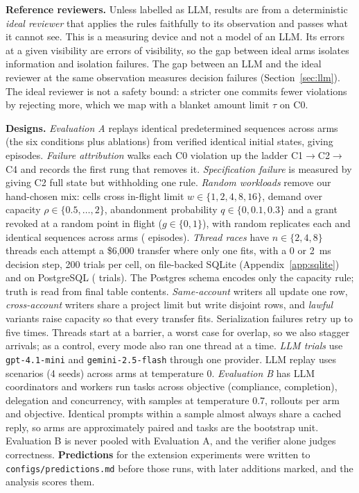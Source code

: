 \documentclass[10pt]{article}
\begin{document}
\textbf{Reference reviewers.} Unless labelled as LLM, results are from a deterministic \emph{ideal reviewer} that applies the rules faithfully to its observation and passes what it cannot see. This is a measuring device and not a model of an LLM. Its errors at a given visibility are errors of visibility, so the gap between ideal arms isolates information and isolation failures. The gap between an LLM and the ideal reviewer at the same observation measures decision failures (Section~\ref{sec:llm}). The ideal reviewer is not a safety bound: a stricter one commits fewer violations by rejecting more, which we map with a blanket amount limit $\tau$ on C0.

\textbf{Designs.} \emph{Evaluation A} replays identical predetermined sequences across \nArms{} arms (the six conditions plus ablations) from verified identical initial states, giving \nEpisodes{} episodes. \emph{Failure attribution} walks each C0 violation up the ladder C1$\to$C2$\to$C4 and records the first rung that removes it. \emph{Specification failure} is measured by giving C2 full state but withholding one rule. \emph{Random workloads} remove our hand-chosen mix: \wlCells{} cells cross in-flight limit $w\in\{1,2,4,8,16\}$, demand over capacity $\rho\in\{0.5,\dots,2\}$, abandonment probability $q\in\{0,0.1,0.3\}$ and a grant revoked at a random point in flight ($g\in\{0,1\}$), with \wlReps{} random replicates each and identical sequences across arms (\wlEpisodes{} episodes). \emph{Thread races} have $n\in\{2,4,8\}$ threads each attempt a \$6,000 transfer where only one fits, with a 0 or 2~ms decision step, 200 trials per cell, on file-backed SQLite (Appendix~\ref{app:sqlite}) and on PostgreSQL \pgVersion{} (\pgTrials{} trials). The Postgres schema encodes only the capacity rule; truth is read from final table contents. \emph{Same-account} writers all update one row, \emph{cross-account} writers share a project limit but write disjoint rows, and \emph{lawful} variants raise capacity so that every transfer fits. Serialization failures retry up to five times. Threads start at a barrier, a worst case for overlap, so we also stagger arrivals; as a control, every mode also ran one thread at a time. \emph{LLM trials} use \texttt{gpt-4.1-mini} and \texttt{gemini-2.5-flash} through one provider. LLM replay uses \nLlmFixedScenarios{} scenarios (4 seeds) across \nLlmFixedArms{} arms at temperature 0. \emph{Evaluation B} has LLM coordinators and workers run \nLlmRollTasks{} tasks across objective (compliance, completion), delegation and concurrency, with \nLlmRollSamples{} samples at temperature 0.7, \rlPerCell{} rollouts per arm and objective. Identical prompts within a sample almost always share a cached reply, so arms are approximately paired and tasks are the bootstrap unit. Evaluation B is never pooled with Evaluation A, and the verifier alone judges correctness. \textbf{Predictions} for the extension experiments were written to \texttt{configs/predictions.md} before those runs, with later additions marked, and the analysis scores them.
\end{document}
